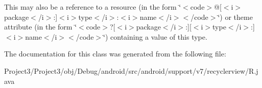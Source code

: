This may also be a reference to a resource (in the form \char`\"{}$<$code$>$@\mbox{[}$<$i$>$package$<$/i$>$\+:\mbox{]}$<$i$>$type$<$/i$>$\+:$<$i$>$name$<$/i$>$$<$/code$>$\char`\"{}) or theme attribute (in the form \char`\"{}$<$code$>$?\mbox{[}$<$i$>$package$<$/i$>$\+:\mbox{]}\mbox{[}$<$i$>$type$<$/i$>$\+:\mbox{]}$<$i$>$name$<$/i$>$$<$/code$>$\char`\"{}) containing a value of this type. 

The documentation for this class was generated from the following file\+:\begin{DoxyCompactItemize}
\item 
Project3/\+Project3/obj/\+Debug/android/src/android/support/v7/recyclerview/R.\+java\end{DoxyCompactItemize}
